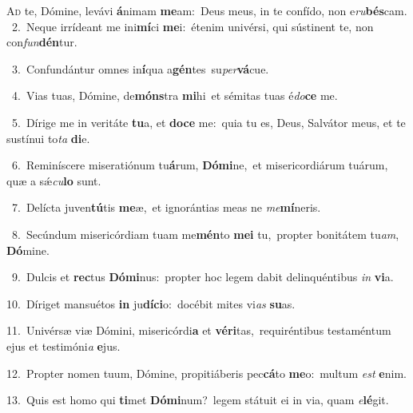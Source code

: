 \lettrine{\initial\textcolor{\initialcolor}{A}}{d} te, Dómine, levávi \textbf{á}\-nimam \textbf{me}\-am:~\star Deus meus, in te confído, non e\-\textit{ru}\-\textbf{bés}cam.\\
{\numbfont\textcolor{\numbcolor}{~2.}}~Neque irrídeant me ini\-\textbf{mí}\-ci \textbf{me}\-i:~\star étenim univérsi, qui sústinent te, non con\-\textit{fun}\-\textbf{dén}tur.\par
{\numbfont\textcolor{\numbcolor}{~3.}}~Confundántur omnes in\-\textbf{í}\-qua a\-\textbf{gén}\-tes~\star su\-\textit{per}\-\textbf{vá}cue.\par
{\numbfont\textcolor{\numbcolor}{~4.}}~Vias tuas, Dómine, de\-\textbf{móns}\-tra \textbf{mi}\-hi~\star et sémitas tuas é\-\textit{do}\-\textbf{ce} me.\par
{\numbfont\textcolor{\numbcolor}{~5.}}~Dírige me in veritáte \textbf{tu}\-a, et \textbf{do}\-\textbf{ce} me:~\star quia tu es, Deus, Salvátor meus, et te sustínui to\textit{ta} \textbf{di}\-e.\par
{\numbfont\textcolor{\numbcolor}{~6.}}~Reminíscere miseratiónum tu\-\textbf{á}\-rum, \textbf{Dó}\-\textbf{mi}ne,~\star et misericordiárum tuárum, quæ a sǽ\-\textit{cu}\-\textbf{lo} sunt.\par
{\numbfont\textcolor{\numbcolor}{~7.}}~Delícta juven\-\textbf{tú}\-tis \textbf{me}\-æ,~\star et ignorántias meas ne \textit{me}\-\textbf{mí}neris.\par
{\numbfont\textcolor{\numbcolor}{~8.}}~Secúndum misericórdiam tuam me\-\textbf{mén}\-to \textbf{me}\-\textbf{i} tu,~\star propter bonitátem tu\-\textit{am}\-, \textbf{Dó}\-mine.\par
{\numbfont\textcolor{\numbcolor}{~9.}}~Dulcis et \textbf{rec}\-tus \textbf{Dó}\-\textbf{mi}nus:~\star propter hoc legem dabit delinquéntibus \textit{in} \textbf{vi}\-a.\par
{\numbfont\textcolor{\numbcolor}{10.}}~Díriget mansuétos \textbf{in} ju\-\textbf{dí}\-\textbf{ci}o:~\star docébit mites vi\textit{as} \textbf{su}\-as.\par
{\numbfont\textcolor{\numbcolor}{11.}}~Univérsæ viæ Dómini, misericórdi\textbf{a} et \textbf{vé}\-\textbf{ri}tas,~\star requiréntibus testaméntum ejus et testimóni\textit{a} \textbf{e}\-jus.\par
{\numbfont\textcolor{\numbcolor}{12.}}~Propter nomen tuum, Dómine, propitiáberis pec\-\textbf{cá}\-to \textbf{me}\-o:~\star multum \textit{est} \textbf{e}\-nim.\par
{\numbfont\textcolor{\numbcolor}{13.}}~Quis est homo qui \textbf{ti}\-met \textbf{Dó}\-\textbf{mi}num?~\star legem státuit ei in via, quam \textit{e}\-\textbf{lé}git.\par
